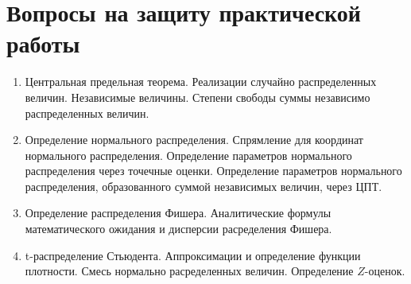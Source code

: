 \documentclass[
]{article}
\begin{document}
\hypertarget{ux432ux43eux43fux440ux43eux441ux44b-ux43dux430-ux437ux430ux449ux438ux442ux443-ux43fux440ux430ux43aux442ux438ux447ux435ux441ux43aux43eux439-ux440ux430ux431ux43eux442ux44b}{%
\section{\texorpdfstring{\textbf{Вопросы на защиту практической
работы}}{Вопросы на защиту практической работы}}\label{ux432ux43eux43fux440ux43eux441ux44b-ux43dux430-ux437ux430ux449ux438ux442ux443-ux43fux440ux430ux43aux442ux438ux447ux435ux441ux43aux43eux439-ux440ux430ux431ux43eux442ux44b}}

\begin{enumerate}
\def\labelenumi{\arabic{enumi}.}
\item
  Центральная предельная теорема. Реализации случайно распределенных
  величин. Независимые величины. Степени свободы суммы независимо
  распределенных величин.
\item
  Определение нормального распределения. Спрямление для координат
  нормального распределения. Определение параметров нормального
  распределения через точечные оценки. Определение параметров
  нормального распределения, образованного суммой независимых величин,
  через ЦПТ.
\item
  Определение распределения Фишера. Аналитические формулы
  математического ожидания и дисперсии расределения Фишера.
\item
  t-распределение Стьюдента. Аппроксимации и определение функции
  плотности. Смесь нормально расределенных величин. Определение
  \(Z\)-оценок.
\end{enumerate}
\end{document}
